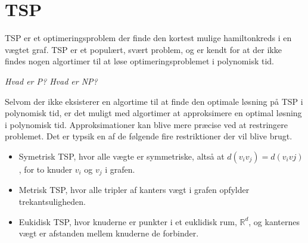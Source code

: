 \section{TSP}
TSP er et optimeringsproblem der finde den kortest mulige hamiltonkreds i en vægtet graf. TSP er et populært, svært problem, og er kendt for at der ikke findes nogen algortimer til at løse optimeringsproblemet i polynomisk tid. 

\textit{Hvad er P? Hvad er NP?}

Selvom der ikke eksisterer en algortime til at finde den optimale løsning på TSP i polynomisk tid, er det muligt med algortimer at approksimere en optimal løsning i polynomisk tid. Approksimationer kan blive mere præcise ved at restringere problemet.
Det er typsik en af de følgende fire restriktioner der vil blive brugt. 
\begin{itemize}
	\item Symetrisk TSP, hvor alle vægte er symmetriske, altså at $d(v_i v_j) = d(v_i vj)$, for to knuder $v_i$ og $v_j$ i grafen.
	\item Metrisk TSP, hvor alle tripler af kanters vægt i grafen opfylder trekantsuligheden.
	\item Eukidisk TSP, hvor knuderne er punkter i et euklidisk rum, ${\mathbb{R}}^d$, og kanternes vægt er afstanden mellem knuderne de forbinder.
\end{itemize}

